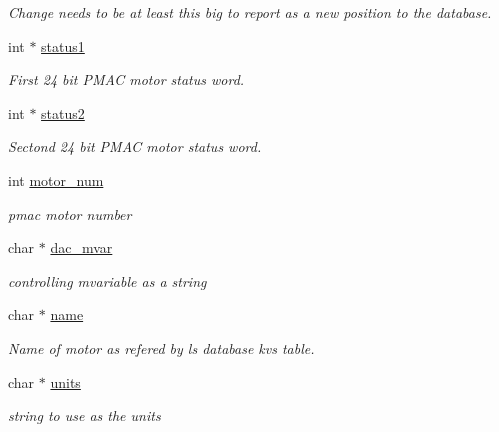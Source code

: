 \begin{DoxyCompactItemize}
\begin{DoxyCompactList}\small\item\em Change needs to be at least this big to report as a new position to the database. \item\end{DoxyCompactList}\item 
int $\ast$ \hyperlink{structlspmac__motor__struct_a17e0953d269d53137c508e391cb16e47}{status1}
\begin{DoxyCompactList}\small\item\em First 24 bit PMAC motor status word. \item\end{DoxyCompactList}\item 
int $\ast$ \hyperlink{structlspmac__motor__struct_ac16fec220714218334764a1038f3813a}{status2}
\begin{DoxyCompactList}\small\item\em Sectond 24 bit PMAC motor status word. \item\end{DoxyCompactList}\item 
int \hyperlink{structlspmac__motor__struct_a45fae17618f0c0827e97060dc04f79cb}{motor\_\-num}
\begin{DoxyCompactList}\small\item\em pmac motor number \item\end{DoxyCompactList}\item 
char $\ast$ \hyperlink{structlspmac__motor__struct_a05dff021221abbc1bf656039fffb3275}{dac\_\-mvar}
\begin{DoxyCompactList}\small\item\em controlling mvariable as a string \item\end{DoxyCompactList}\item 
char $\ast$ \hyperlink{structlspmac__motor__struct_aa90af2f6f1489f1befe1d0891e51575a}{name}
\begin{DoxyCompactList}\small\item\em Name of motor as refered by ls database kvs table. \item\end{DoxyCompactList}\item 
char $\ast$ \hyperlink{structlspmac__motor__struct_a82bceff2ae698b4b9618360b446aec08}{units}
\begin{DoxyCompactList}\small\item\em string to use as the units \item\end{DoxyCompactList}\item 

\end{DoxyCompactItemize}
